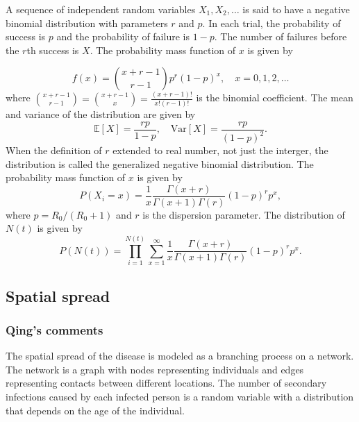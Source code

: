 \documentclass{article}
\begin{document}
A sequence of independent random variables $X_1, X_2, \ldots$ is said to have a negative binomial distribution with parameters $r$ and $p$. In each trial, the probability of success is $p$ and the probability of failure is $1-p$. The number of failures before the $r$th success is $X$. The probability mass function of $x$ is given by

\begin{equation}
    f(x) = \binom{x+r-1}{r-1} p^r (1-p)^x, \quad x = 0, 1, 2, \ldots
\end{equation}
where $\binom{x+r-1}{r-1} = \binom{x+r-1}{x}  = \frac{(x+r-1)!}{x! (r-1)!}$ is the binomial coefficient. The mean and variance of the distribution are given by
\begin{equation}
    \mathbb{E}[X] = \frac{rp}{1-p}, \quad \text{Var}[X] = \frac{rp}{(1-p)^2}.
\end{equation}
When the definition of $r$ extended to real number, not just the interger, the distribution is called the generalized negative binomial distribution. The probability mass function of $x$ is given by
\begin{equation}
P(X_i = x) = \frac{1}{x} \frac{\Gamma(x+r)}{\Gamma(x+1) \Gamma(r)} (1-p)^r p^x,
\end{equation}
where $p = R_{0} / (R_{0} + 1)$ and $r$ is the dispersion parameter. The distribution of $N(t)$ is given by
\begin{equation}
P(N(t)) = \prod_{i=1}^{N(t)} \sum_{x=1}^{\infty} \frac{1}{x} \frac{\Gamma(x+r)}{\Gamma(x+1) \Gamma(r)} (1-p)^r p^x.
\end{equation}


\subsection{Spatial spread}
\subsubsection*{Qing's comments}
The spatial spread of the disease is modeled as a branching process on a network. The network is a graph with nodes representing individuals and edges representing contacts between different locations. The number of secondary infections caused by each infected person is a random variable with a distribution that depends on the age of the individual. 


\printbibliography
\end{document}
